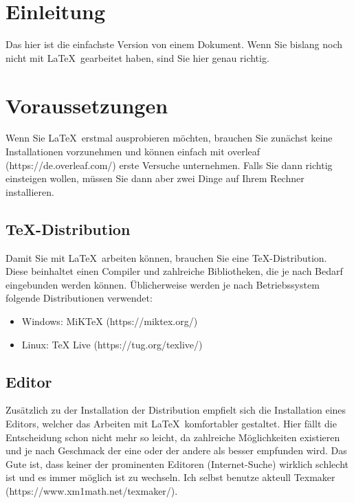 \documentclass[12pt,a4paper]{scrartcl}
\begin{document}
%
\section{Einleitung}
Das hier ist die einfachste Version von einem Dokument. 
Wenn Sie bislang noch nicht mit \LaTeX\, gearbeitet haben, sind Sie hier genau richtig.
%
\section{Voraussetzungen}
Wenn Sie \LaTeX\, erstmal ausprobieren möchten, brauchen Sie zunächst keine Installationen vorzunehmen und können einfach mit overleaf (https://de.overleaf.com/) erste Versuche unternehmen.
Falls Sie dann richtig einsteigen wollen, müssen Sie dann aber zwei Dinge auf Ihrem Rechner installieren.
%
\subsection{TeX-Distribution}
Damit Sie mit \LaTeX\, arbeiten können, brauchen Sie eine TeX-Distribution.
Diese beinhaltet einen Compiler und zahlreiche Bibliotheken, die je nach Bedarf eingebunden werden können.
Üblicherweise werden je nach Betriebssystem folgende Distributionen verwendet:
%
\begin{itemize}
\item Windows: MiKTeX (https://miktex.org/)
\item Linux: TeX Live (https://tug.org/texlive/)
\end{itemize}
%
\subsection{Editor}
Zusätzlich zu der Installation der Distribution empfielt sich die Installation eines Editors, welcher das Arbeiten mit \LaTeX\, komfortabler gestaltet. 
Hier fällt die Entscheidung schon nicht mehr so leicht, da zahlreiche Möglichkeiten existieren und je nach Geschmack der eine oder der andere als besser empfunden wird.
Das Gute ist, dass keiner der prominenten Editoren (Internet-Suche) wirklich schlecht ist und es immer möglich ist zu wechseln.
Ich selbst benutze akteull Texmaker (https://www.xm1math.net/texmaker/).
%
\end{document}
